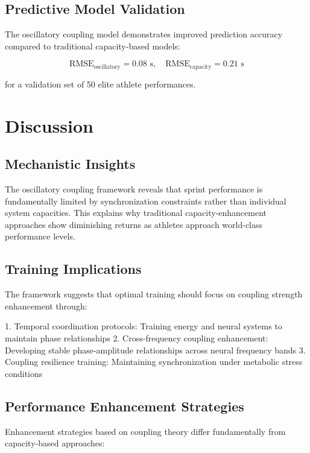 \documentclass[twocolumn]{article}
\begin{document}
\subsection{Predictive Model Validation}

The oscillatory coupling model demonstrates improved prediction accuracy compared to traditional capacity-based models:

\begin{equation}
\text{RMSE}_{\text{oscillatory}} = 0.08 \text{ s}, \quad \text{RMSE}_{\text{capacity}} = 0.21 \text{ s}
\label{eq:prediction_accuracy}
\end{equation}

for a validation set of 50 elite athlete performances.

\section{Discussion}

\subsection{Mechanistic Insights}

The oscillatory coupling framework reveals that sprint performance is fundamentally limited by synchronization constraints rather than individual system capacities. This explains why traditional capacity-enhancement approaches show diminishing returns as athletes approach world-class performance levels.

\subsection{Training Implications}

The framework suggests that optimal training should focus on coupling strength enhancement through:

1. Temporal coordination protocols: Training energy and neural systems to maintain phase relationships
2. Cross-frequency coupling enhancement: Developing stable phase-amplitude relationships across neural frequency bands
3. Coupling resilience training: Maintaining synchronization under metabolic stress conditions

\subsection{Performance Enhancement Strategies}

Enhancement strategies based on coupling theory differ fundamentally from capacity-based approaches:
\end{document}

